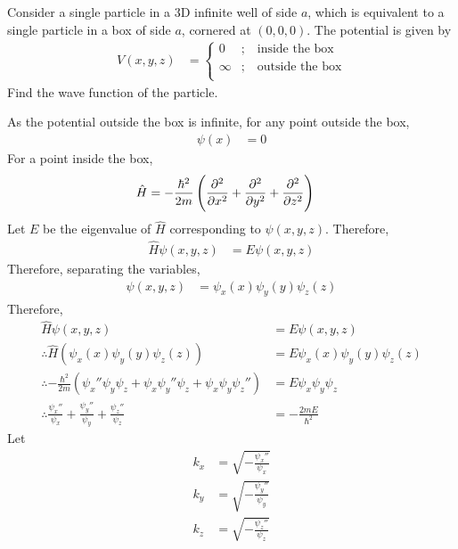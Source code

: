\documentclass[titlepage, fleqn, a4paper, 12pt, twoside]{article}
\theoremstyle{definition}
\theoremstyle{theorem}
\begin{document}
\begin{question}
	Consider a single particle in a 3D infinite well of side $a$, which is equivalent to a single particle in a box of side $a$, cornered at $(0,0,0)$.
	The potential is given by
	\begin{align*}
		V(x,y,z) &=
			\begin{cases}
				0 &;\quad \text{inside the box}\\
				\infty &;\quad \text{outside the box}\\
			\end{cases}
	\end{align*}
	Find the wave function of the particle.
\end{question}

\begin{solution}
	As the potential outside the box is infinite, for any point outside the box,
	\begin{align*}
		\psi(x) &= 0
	\end{align*}
	For a point inside the box,
	\begin{align*}
		\hat{H} &= -\frac{\hbar^2}{2 m} \left( \dpd[2]{}{x} + \dpd[2]{}{y} + \dpd[2]{}{z} \right)
	\end{align*}
	Let $E$ be the eigenvalue of $\hat{H}$ corresponding to $\psi(x,y,z)$.
	Therefore,
	\begin{align*}
		\hat{H} \psi(x,y,z) &= E \psi(x,y,z)
	\end{align*}
	Therefore, separating the variables,
	\begin{align*}
		\psi(x,y,z) &= \psi_x(x) \psi_y(y) \psi_z(z)
	\end{align*}
	Therefore,
	\begin{align*}
		\hat{H} \psi(x,y,z) &= E \psi(x,y,z)\\
		\therefore \hat{H} \left( \psi_x(x) \psi_y(y) \psi_z(z) \right) &= E \psi_x(x) \psi_y(y) \psi_z(z)\\
		\therefore -\frac{\hbar^2}{2 m} \left( {\psi_x}'' \psi_y \psi_z + \psi_x {\psi_y}'' \psi_z + \psi_x \psi_y {\psi_z}'' \right) &= E \psi_x \psi_y \psi_z\\
		\therefore \frac{{\psi_x}''}{\psi_x} + \frac{{\psi_y}''}{\psi_y} + \frac{{\psi_z}''}{\psi_z} &= -\frac{2 m E}{\hbar^2}
	\end{align*}
	Let
	\begin{align*}
		k_x &= \sqrt{-\frac{{\psi_x}''}{\psi_x}}\\
		k_y &= \sqrt{-\frac{{\psi_y}''}{\psi_y}}\\
		k_z &= \sqrt{-\frac{{\psi_z}''}{\psi_z}}\\

\end{align*}
\end{solution}
\end{document}
